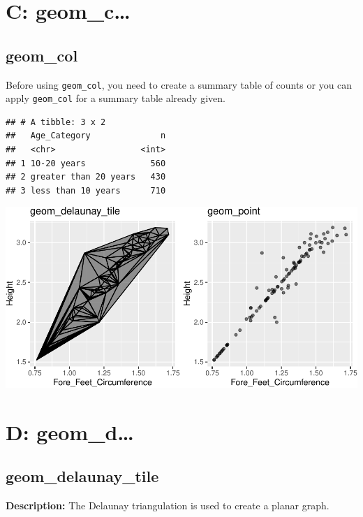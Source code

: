 \documentclass[
]{book}
\begin{document}
\hypertarget{c-geom_c}{%
\chapter{C: geom\_c\ldots{}}\label{c-geom_c}}

\hypertarget{geom_col}{%
\section{geom\_col}\label{geom_col}}

Before using \texttt{geom\_col}, you need to create a summary table of counts or you can apply \texttt{geom\_col} for a summary table already given.

\begin{verbatim}
## # A tibble: 3 x 2
##   Age_Category              n
##   <chr>                 <int>
## 1 10-20 years             560
## 2 greater than 20 years   430
## 3 less than 10 years      710
\end{verbatim}

\includegraphics{Data-Visualisation-geom-Encyclopedia_files/figure-latex/unnamed-chunk-30-1.pdf}

\hypertarget{d-geom_d}{%
\chapter{D: geom\_d\ldots{}}\label{d-geom_d}}

\hypertarget{geom_delaunay_tile}{%
\section{geom\_delaunay\_tile}\label{geom_delaunay_tile}}

\textbf{Description:} The Delaunay triangulation is used to create a planar graph.
\end{document}
